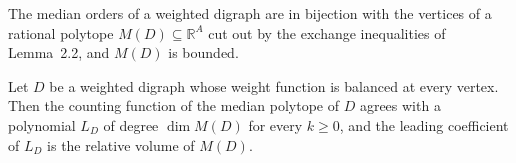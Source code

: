 
\begin{theorem}\label{Bellamy19-thm-2.3}
The median orders of a weighted digraph are in bijection with the vertices of a rational polytope $M(D) \subseteq \mathbb{R}^{A}$ cut out by the exchange inequalities of Lemma~2.2, and $M(D)$ is bounded.
\end{theorem}

\begin{theorem}\label{Bellamy19-thm-3.2}
Let $D$ be a weighted digraph whose weight function is balanced at every vertex. Then the counting function of the median polytope of $D$ agrees with a polynomial $L_{D}$ of degree $\dim M(D)$ for every $k \geq 0$, and the leading coefficient of $L_{D}$ is the relative volume of $M(D)$.
\end{theorem}
